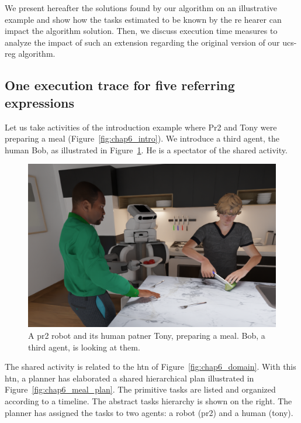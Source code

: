We present hereafter the solutions found by our algorithm on an illustrative example and show how the tasks estimated to be known by the \acrshort{re} hearer can impact the algorithm solution. Then, we discuss execution time measures to analyze the impact of such an extension regarding the original version of our \acrshort{ucs}-\acrshort{reg} algorithm.

\subsection{One execution trace for five referring expressions}

Let us take activities of the introduction example where Pr2 and Tony were preparing a meal (Figure~\ref{fig:chap6_intro}). We introduce a third agent, the human Bob, as illustrated in Figure~\ref{fig:chap6_bob}. He is a spectator of the shared activity.

\begin{figure}[ht!]
\centering
\includegraphics[width=\textwidth]{figures/chapter6/bob.png}
\caption{\label{fig:chap6_bob} A pr2 robot and its human patner Tony, preparing a meal. Bob, a third agent, is looking at them.}
\end{figure}

The shared activity is related to the \acrshort{htn} of Figure~\ref{fig:chap6_domain}. With this \acrshort{htn}, a planner has elaborated a shared hierarchical plan illustrated in Figure~\ref{fig:chap6_meal_plan}. The primitive tasks are listed and organized according to a timeline. The abstract tasks hierarchy is shown on the right. The planner has assigned the tasks to two agents: a robot (pr2) and a human (tony).
 
